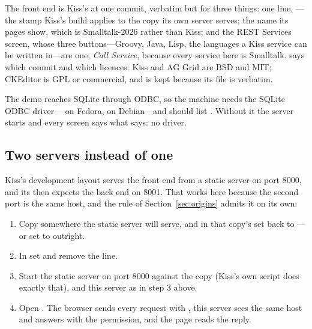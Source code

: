 The front end is Kiss's at one commit, verbatim but for three things: one
line, ---the stamp Kiss's build
applies to the copy its own server serves; the name its pages show, which
is Smalltalk-2026 rather than Kiss; and the REST Services screen, whose
three buttons---Groovy, Java, Lisp, the languages a Kiss service can be
written in---are one, \emph{Call Service}, because every service here is
Smalltalk. 
says which commit and which licences: Kiss and AG Grid are BSD and MIT;
CKEditor is GPL or commercial, and is kept because its file is verbatim.

\begin{stnote}
The demo reaches SQLite through ODBC, so the machine needs the SQLite ODBC
driver--- on Fedora,  on Debian---and
 should list \ct{[SQLITE3]}. Without it the server
starts and every screen says what  says: no driver.
\end{stnote}

\subsection{Two servers instead of one}

Kiss's development layout serves the front end from a static server on
port 8000, and its  then expects the back end on 8001. That
works here because the second port is the same host, and the rule of
Section~\ref{sec:origins} admits it on its own:

\begin{enumerate}
\item Copy  somewhere the static server will serve,
  and in that copy's  set  back to
  ---or set  to
   outright.
\item In  set  and remove the
   line.
\item Start the static server on port 8000 against the copy (Kiss's own
   script does exactly that), and this server as in step 3
  above.
\item Open . The browser sends every request
  with , this server sees the same host
  and answers with the permission, and the page reads the reply.
\end{enumerate}

